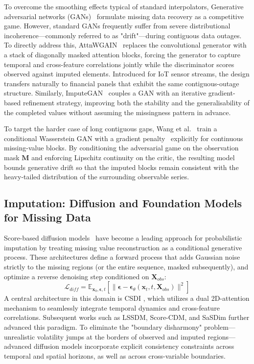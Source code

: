 To overcome the smoothing effects typical of standard interpolators, Generative adversarial networks (GANs)~\citep{goodfellow2014gan,yoon2018gain} formulate missing data recovery as a competitive game. However, standard GANs frequently suffer from severe distributional incoherence—commonly referred to as "drift"—during contiguous data outages. To directly address this, AttnWGAIN~\citep{wang2025attn} replaces the convolutional generator with a stack of diagonally masked attention blocks, forcing the generator to capture temporal and cross-feature correlations jointly while the discriminator scores observed against imputed elements. Introduced for IoT sensor streams, the design transfers naturally to financial panels that exhibit the same contiguous-outage structure. Similarly, ImputeGAN~\citep{qin2023imputegan} couples a GAN with an iterative gradient-based refinement strategy, improving both the stability and the generalisability of the completed values without assuming the missingness pattern in advance.

To target the harder case of long contiguous gaps, Wang et al.~\citep{wang2024cwgain} train a conditional Wasserstein GAN with a gradient penalty~\citep{arjovsky2017wgan,gulrajani2017wgangp} explicitly for continuous missing-value blocks. By conditioning the adversarial game on the observation mask $\mathbf{M}$ and enforcing Lipschitz continuity on the critic, the resulting model bounds generative drift so that the imputed blocks remain consistent with the heavy-tailed distribution of the surrounding observable series.

\subsection{Imputation: Diffusion and Foundation Models for Missing Data}

Score-based diffusion models~\citep{ho2020ddpm,song2019generative,song2021score} have become a leading approach for probabilistic imputation by treating missing value reconstruction as a conditional generative process. These architectures define a forward process that adds Gaussian noise strictly to the missing regions (or the entire sequence, masked subsequently), and optimize a reverse denoising step conditioned on $\mathbf{X}_{obs}$:
\begin{equation}
\mathcal{L}_{diff} = \mathbb{E}_{\mathbf{x}_0, \boldsymbol{\epsilon}, t}[\|\boldsymbol{\epsilon} - \boldsymbol{\epsilon}_\theta(\mathbf{x}_t, t, \mathbf{X}_{obs})\|^2]
\end{equation}
A central architecture in this domain is CSDI \citep{tashiro2021csdi}, which utilizes a dual 2D-attention mechanism to seamlessly integrate temporal dynamics and cross-feature correlations. Subsequent works such as LSSDM, Score-CDM, and SaSDim \citep{LSSDM, Score-CDM, SaSDim} further advanced this paradigm. To eliminate the "boundary disharmony" problem—unrealistic volatility jumps at the borders of observed and imputed regions—advanced diffusion models incorporate explicit consistency constraints across temporal and spatial horizons, as well as across cross-variable boundaries.

